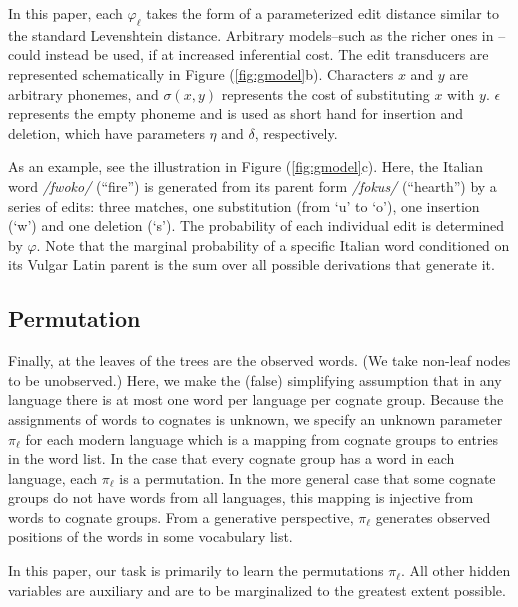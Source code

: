\documentclass[11pt,a4paper]{article}
\begin{document}
In this paper, each $\varphi_\ell$ takes the form of a parameterized
edit distance similar to the standard Levenshtein distance.  Arbitrary
models--such as the richer ones in --could
instead be used, if at increased inferential cost.   The edit
transducers are represented schematically in Figure (\ref{fig:gmodel}b).
Characters $x$ and $y$ are arbitrary phonemes, and $\sigma(x,y)$
represents the cost of substituting $x$ with $y$.  $\epsilon$
represents the empty phoneme and is used as short hand for insertion
and deletion, which have parameters $\eta$ and $\delta$, respectively.

As an example, see the illustration in Figure (\ref{fig:gmodel}c).
Here, the Italian word \textit{/fwoko/} (``fire'') is generated from
its parent form \textit{/fokus/} (``hearth'') by a series of edits:
three matches, one substitution (from `u' to `o'), one insertion (`w') and
one deletion (`s').  The probability of each individual edit is
determined by $\varphi$.  Note that the marginal probability of a
specific Italian word conditioned on its Vulgar Latin parent is the
sum over all possible derivations that generate it.

\subsection{Permutation}

Finally, at the leaves of the trees are the observed words. (We
take non-leaf nodes to be unobserved.) Here, we make the (false)
simplifying assumption that in any language there is at most one
word per language per cognate group. Because the assignments of
words to cognates is unknown, we specify an unknown parameter
$\pi_\ell$ for each modern language which is a mapping from cognate
groups to entries in the word list. In the case that every cognate
group has a word in each language, each $\pi_\ell$ is a permutation.
In the more general case that some cognate groups do not have words
from all languages, this mapping is injective from words to cognate
groups. From a generative perspective, $\pi_\ell$ generates observed
positions of the words in some vocabulary list.

In this paper, our task is primarily to learn the permutations
$\pi_\ell$. All other hidden variables are auxiliary and are to be
marginalized to the greatest extent possible.
\end{document}
